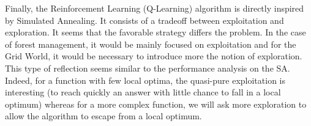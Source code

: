 \documentclass[11pt]{article}
\begin{document}
\begin{multicols}{2}
Finally, the Reinforcement Learning (Q-Learning) algorithm is directly inspired by Simulated Annealing. It consists of a tradeoff between exploitation and exploration. It seems that the favorable strategy differs the problem. In the case of forest management, it would be mainly focused on exploitation and for the Grid World, it would be necessary to introduce more the notion of exploration. This type of reflection seems similar to the performance analysis on the SA. Indeed, for a function with few local optima, the quasi-pure exploitation is interesting (to reach quickly an answer with little chance to fall in a local optimum) whereas for a more complex function, we will ask more exploration to allow the algorithm to escape from a local optimum.

\end{multicols}
\end{document}
